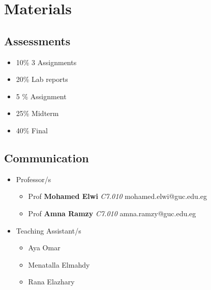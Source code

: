 \documentclass[11pt]{article}
\begin{document}
\section{Materials}
\begin{multicols}{2}
\subsection{Assessments}
\begin{itemize}
	\item 10\% 3 Assignments
\item 20\% Lab reports
\item 5 \% Assignment
\item 25\% Midterm
\item 40\% Final
\end{itemize}
\subsection{Communication}
\begin{itemize}
\item Professor/s 
\begin{itemize}

	\item Prof \textbf{Mohamed Elwi} \textit{C7.010} mohamed.elwi@guc.edu.eg 
	\item Prof \textbf{Amna Ramzy} \textit{C7.010} amna.ramzy@guc.edu.eg 

\end{itemize}
\item Teaching Assistant/s
\begin{itemize}
	\item Aya Omar
	\item Menatalla Elmahdy
	\item Rana Elazhary
\end{itemize}
\end{itemize}
\end{multicols}
\end{document}
